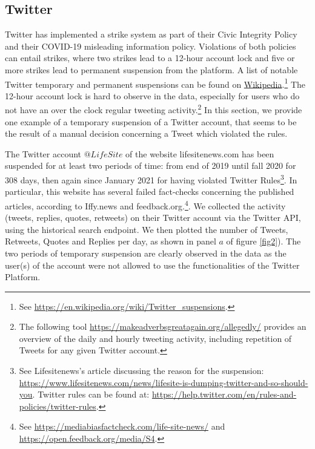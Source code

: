 \documentclass{article}
\begin{document}
\subsection{Twitter}

Twitter has implemented a strike system as part of their Civic Integrity Policy and their COVID-19 misleading information policy. Violations of both policies can entail strikes, where two strikes lead to a 12-hour account lock and five or more strikes lead to permanent suspension from the platform. A list of notable Twitter temporary and permanent suspensions can be found on  \href{https://en.wikipedia.org/wiki/Twitter_suspensions}{Wikipedia}.\footnote{See \href{https://en.wikipedia.org/wiki/Twitter\_suspensions}{https://en.wikipedia.org/wiki/Twitter\_suspensions}.}
The 12-hour account lock is hard to observe in the data, 
especially for users who do not have an over the clock regular tweeting activity.\footnote{The following tool \href{https://makeadverbsgreatagain.org/allegedly/}{https://makeadverbsgreatagain.org/allegedly/} provides an overview of the daily and hourly tweeting activity, including repetition of Tweets for any given Twitter account.} 
In this section, we provide one example of a temporary suspension of a Twitter account, that seems to be the result of a manual decision concerning a Tweet which violated the rules. 

The Twitter account $@LifeSite$ of the website lifesitenews.com has been suspended for at least two periods of time: from end of 2019 until fall 2020 for 308 days, then again since January 2021 for having violated Twitter Rules\footnote{See Lifesitenews's article discussing the reason for the suspension: \href{https://www.lifesitenews.com/news/lifesite-is-dumping-twitter-and-so-should-you}{https://www.lifesitenews.com/news/lifesite-is-dumping-twitter-and-so-should-you}. Twitter rules can be found at: \href{https://help.twitter.com/en/rules-and-policies/twitter-rules}{https://help.twitter.com/en/rules-and-policies/twitter-rules}. }. In particular, this website has several failed fact-checks concerning the published articles, according to Iffy.news and feedback.org.\footnote{See \href{https://mediabiasfactcheck.com/life-site-news/}{https://mediabiasfactcheck.com/life-site-news/} and \href{https://open.feedback.org/media/S4}{https://open.feedback.org/media/S4}.}. We collected the activity (tweets, replies, quotes, retweets) on their Twitter account via the Twitter API, using the historical search endpoint. We then plotted the number of Tweets, Retweets, Quotes and Replies per day, as shown in panel $a$ of figure \ref{fig2}). The two periods of temporary suspension are clearly observed in the data as the user(s) of the account were not allowed to use the functionalities of the Twitter Platform. 
\end{document}
